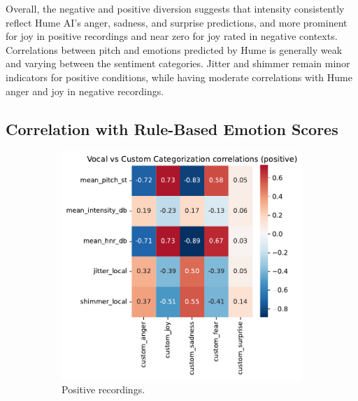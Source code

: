 \medskip
Overall, the negative and positive diversion suggests that intensity consistently reflect Hume AI’s anger, sadness, and surprise predictions, and more prominent for joy in positive recordings and near zero for joy rated in negative contexts. 
Correlations between pitch and emotions predicted by Hume is generally weak and varying between the sentiment categories. 
 Jitter and shimmer remain minor indicators for positive conditions, while having moderate correlations with Hume anger and joy in negative recordings.

\subsection{Correlation with Rule-Based Emotion Scores}

\begin{figure}[H]
    \centering 
    \begin{subfigure}[b]{0.45\textwidth}
        \includegraphics[width=\textwidth]{png/results/rq1_nr3/vocal_vs_custom_categorization_correlations_positive.png.pdf}
        \caption{Positive recordings.}
        \label{fig:custom_vocal_positive}
    \end{subfigure}
    \begin{subfigure}[b]{0.45\textwidth}

\end{subfigure}
\end{figure}
